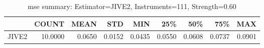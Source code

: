 \begin{table}[ht]
\centering
\caption{mse summary: Estimator=JIVE2, Instruments=111, Strength=0.60}
\begin{tabular}{lrrrrrrrr}
\toprule
 & COUNT & MEAN & STD & MIN & 25\% & 50\% & 75\% & MAX \\
\midrule
JIVE2 & 10.0000 & 0.0650 & 0.0152 & 0.0435 & 0.0550 & 0.0608 & 0.0737 & 0.0901 \\
\bottomrule
\end{tabular}
\end{table}
